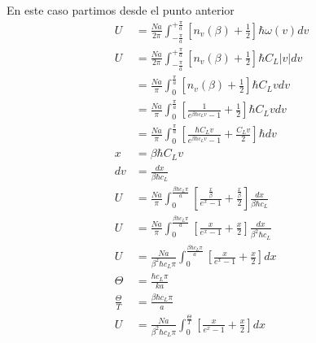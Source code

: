 \documentclass{report}
\begin{document}
En este caso partimos desde el punto anterior
\begin{align*}
	U &=\frac{Na}{2\pi}\int_{-\frac{\pi}{a}}^{+\frac{\pi}{a}}\left[ n_v(\beta) + \frac{1}{2} \right]\hbar \omega(v) dv\\
	U &=\frac{Na}{2\pi}\int_{-\frac{\pi}{a}}^{+\frac{\pi}{a}}\left[ n_v(\beta) + \frac{1}{2} \right]\hbar C_L \left| v \right| dv\\
	&=\frac{Na}{\pi}\int_{0}^{\frac{\pi}{a}}\left[ n_v(\beta) + \frac{1}{2} \right]\hbar C_L v dv\\
	&=\frac{Na}{\pi}\int_{0}^{\frac{\pi}{a}}\left[ \frac{1}{e^{\beta\hbar c_L v} - 1} + \frac{1}{2} \right]\hbar C_L v dv\\
	&=\frac{Na}{\pi}\int_{0}^{\frac{\pi}{a}}\left[ \frac{\hbar C_L v}{e^{\beta\hbar c_L v} - 1} + \frac{C_L v}{2} \right]\hbar dv\\
	x &= \beta \hbar C_L v\\
	dv &= \frac{dx}{\beta \hbar c_L}\\
	U &=\frac{Na}{\pi}\int_{0}^{\frac{\beta\hbar c_L\pi}{a}}\left[ \frac{\frac{x}{\beta}}{e^{x} - 1} + \frac{\frac{x}{\beta}}{2} \right] \frac{dx}{\beta\hbar c_L} \\
	U &=\frac{Na}{\pi}\int_{0}^{\frac{\beta\hbar c_L\pi}{a}}\left[ \frac{x}{e^{x} - 1} + \frac{x}{2} \right] \frac{dx}{\beta^2\hbar c_L} \\
	U &=\frac{Na}{\beta^2\hbar c_L\pi}\int_{0}^{\frac{\beta\hbar c_L\pi}{a}}\left[ \frac{x}{e^{x} - 1} + \frac{x}{2} \right] dx \\
	\Theta &= \frac{\hbar c_L\pi}{k a}\\
	\frac{\Theta}{T} &= \frac{\beta\hbar c_L\pi}{a}\\
	U &=\frac{Na}{\beta^2\hbar c_L\pi}\int_{0}^{\frac{\Theta}{T}}\left[ \frac{x}{e^{x} - 1} + \frac{x}{2} \right] dx \\
\end{align*}
\end{document}

